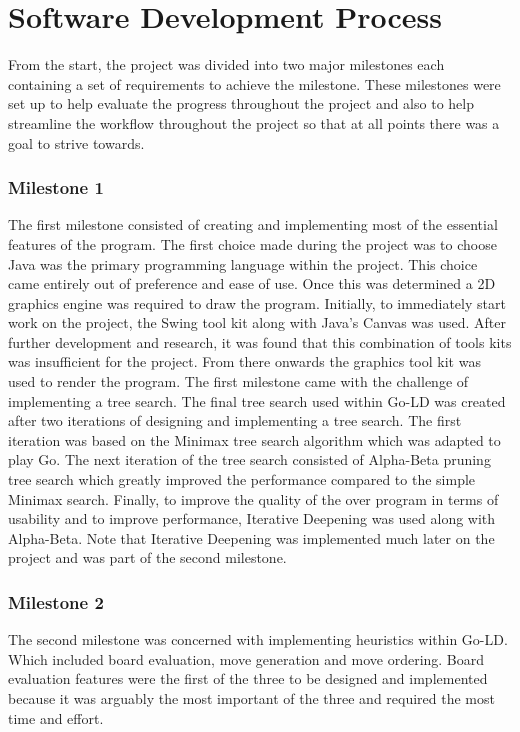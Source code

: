 \documentclass{l4proj}
\begin{document}
\section{Software Development Process}
From the start, the project was divided into two major milestones each containing a set of requirements to achieve the milestone. These milestones were set up to help evaluate the progress throughout the project and also to help streamline the workflow throughout the project so that at all points there was a goal to strive towards.

\subsubsection{Milestone 1}
The first milestone consisted of creating and implementing most of the essential features of the program. The first choice made during the project was to choose Java was the primary programming language within the project. This choice came entirely out of preference and ease of use. Once this was determined a 2D graphics engine was required to draw the program. Initially, to immediately start work on the project, the Swing tool kit along with Java’s Canvas was used. After further development and research, it was found that this combination of tools kits was insufficient for the project. From there onwards the  \cite{SLICK2D} graphics tool kit was used to render the program.
The first milestone came with the challenge of implementing a tree search. The final tree search used within Go-LD was created after two iterations of designing and implementing a tree search. The first iteration was based on the Minimax tree search algorithm which was adapted to play Go. The next iteration of the tree search consisted of Alpha-Beta pruning tree search which greatly improved the performance compared to the simple Minimax search. Finally, to improve the quality of the over program in terms of usability and to improve performance, Iterative Deepening was used along with Alpha-Beta. Note that Iterative Deepening was implemented much later on the project and was part of the second milestone.

\subsubsection{Milestone 2}
The second milestone was concerned with implementing heuristics within Go-LD. Which  included board evaluation, move generation and move ordering. Board evaluation features were the first of the three to be designed and implemented because it was arguably the most important of the three and required the most time and effort.
\end{document}
